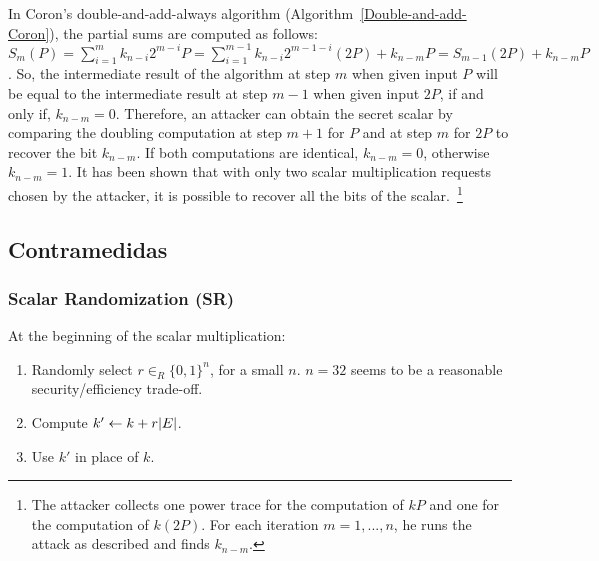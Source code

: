 In Coron's double-and-add-always algorithm (Algorithm~\ref{Double-and-add-Coron}), the partial sums are computed as follows: $S_m(P) = \sum_{i=1}^{m}k_{n-i}2^{m-i} P=\sum_{i=1}^{m-1}k_{n-i}2^{m-1-i}(2P)+k_{n-m}P= S_{m-1}(2P)+k_{n-m}P$. So, the intermediate result of the algorithm at step $m$ when given input $P$ will be equal to the intermediate result at step $m-1$ when given input $2P$, if and only if, $k_{n-m}=0$. Therefore, an attacker can obtain the secret scalar by comparing the doubling computation at step $m+1$ for $P$ and at step $m$ for $2P$ to recover the bit $k_{n-m}.$ If both computations are identical, $k_{n-m}=0$, otherwise $k_{n-m}=1$. It has been shown that with only two scalar multiplication requests chosen by the attacker, it is possible to recover all the bits of the scalar.~\footnote{The attacker collects one power trace for the computation of $kP$ and one for the computation of $k(2P)$. For each iteration $m=1,...,n$, he runs the attack as described and finds $k_{n-m}$.}


\subsection{Contramedidas}


\begin{comment} %
	a.	CM1 - Scalar Randomization (SR)
	b.	CM2 - Proj. Coord. Randomization and Re-randomization (CRR)
	c.	CM3 - Point Blinding (PB) 
	d.	CM4 – Scalar Splitting (SS)
\end{comment}

\subsubsection{Scalar Randomization (SR)}
	At the beginning of the scalar multiplication:
	\begin{enumerate}
		\item Randomly select $r\in_R \{0,1\}^n$, for a small $n$. $n=32$ seems to be a reasonable security/efficiency trade-off.
		\item Compute $k' \leftarrow k + r |E|$.
		\item Use $k'$ in place of $k$.
	\end{enumerate}
	

